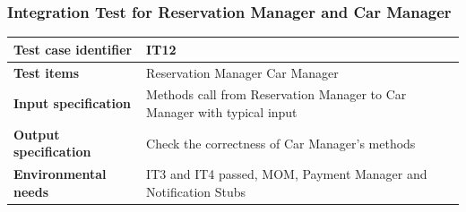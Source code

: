 \documentclass{article}
\begin{document}
			\subsubsection{Integration Test for Reservation Manager and Car Manager} \label{sec:3.1.10}
				\begin{minipage}{\linewidth}
				\end{minipage}
				\begin{center}
					\setlength{\tabcolsep}{24pt}
					\renewcommand{\arraystretch}{1.4}
					\begin{tabular}{ | l | p{8cm} |}\hline
						\textbf{Test case identifier} & IT12\\\hline
						\textbf{Test items} & Reservation Manager \textrightarrow Car Manager\\\hline
						\textbf{Input specification} & Methods call from Reservation Manager to Car Manager with typical input \\\hline
						\textbf{Output specification} & Check the correctness of Car Manager's methods \\\hline
						\textbf{Environmental needs} & IT3 and IT4 passed, MOM, Payment Manager and Notification Stubs \\\hline
					\end{tabular}
				\end{center}
				\pagebreak
\end{document}
